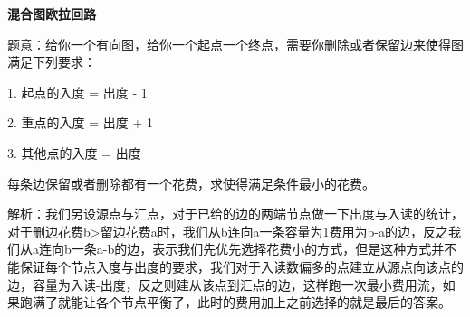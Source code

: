 {\bfseries 混合图欧拉回路}

题意：给你一个有向图，给你一个起点一个终点，需要你删除或者保留边来使得图满足下列要求：

1. 起点的入度 = 出度  - 1

2. 重点的入度 = 出度 + 1

3. 其他点的入度 = 出度

每条边保留或者删除都有一个花费，求使得满足条件最小的花费。

解析：我们另设源点与汇点，对于已给的边的两端节点做一下出度与入读的统计，对于删边花费b>留边花费a时，我们从b连向a一条容量为1费用为b-a的边，反之我们从a连向b一条a-b的边，表示我们先优先选择花费小的方式，但是这种方式并不能保证每个节点入度与出度的要求，我们对于入读数偏多的点建立从源点向该点的边，容量为入读-出度，反之则建从该点到汇点的边，这样跑一次最小费用流，如果跑满了就能让各个节点平衡了，此时的费用加上之前选择的就是最后的答案。

